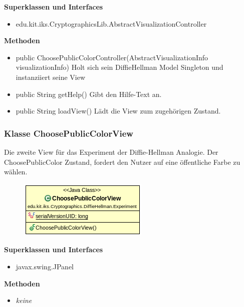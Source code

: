 \documentclass{article}
\begin{document}
      \textbf{Superklassen und Interfaces}
      \begin{itemize}
        \item edu.kit.iks.CryptographicsLib.AbstractVisualizationController
      \end{itemize}

      \textbf{Methoden}
      \begin{itemize}
          \item public ChoosePublicColorController(AbstractVisualizationInfo visualizationInfo) \newline
              Holt sich sein DiffieHellman Model Singleton und instanziiert seine View
        \item public String getHelp() \newline
        Gibt den Hilfe-Text an.
        \item public String loadView() \newline
        Lädt die View zum zugehörigen Zustand.
      \end{itemize}

\subsubsection{Klasse ChoosePublicColorView}
      Die zweite View für das Experiment der Diffie-Hellman Analogie.
      Der ChoosePublicColor Zustand, fordert den Nutzer auf
      eine öffentliche Farbe zu wählen.

      \begin{figure}[H]
        \centering
        \includegraphics{resources/edu-kit-iks-Cryptographics-DiffieHellman-Experiment-ChoosePublicColorView}
      \end{figure}

      \textbf{Superklassen und Interfaces}
      \begin{itemize}
        \item javax.swing.JPanel
      \end{itemize}

      \textbf{Methoden}
      \begin{itemize}
        \item \textit{keine}
      \end{itemize}
\end{document}
